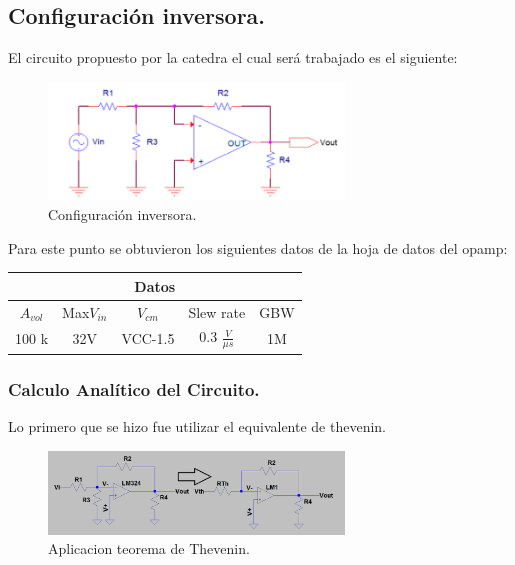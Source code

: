 \subsection{Configuración inversora.}
El circuito propuesto por la catedra el cual será trabajado es el siguiente:

\begin{figure}[htb]	
	\centering
	\includegraphics[width=0.7\textwidth]{Ejercicio1/Imagenes/Circuitoinversor.PNG}
	\caption{Configuración inversora.}
	\label{fig:ConfInv}
\end{figure}
Para este punto se obtuvieron los siguientes datos de la hoja de datos del opamp:
\begin{table}[H]
\begin{center}
\begin{tabular}{|c|c|c|c|c|}
\hline
\multicolumn{5}{|c|}{\textbf{Datos}}                                      \\ \hline
\textbf{$A_{vol}$} & Max$V_{in}$ & $V_{cm}$ & Slew rate             & GBW \\ \hline
100 k              & 32V         & VCC-1.5  & 0.3 $\frac{V}{\mu s}$ & 1M  \\ \hline
\end{tabular}
\end{center}
\end{table}

\subsubsection{Calculo Analítico del Circuito.}
Lo primero que se hizo fue utilizar el equivalente de thevenin.\\

\begin{figure}[htb]	
	\centering
	\includegraphics[width=0.7\textwidth]{Ejercicio1/Imagenes/Thevenin.PNG}
	\caption{Aplicacion teorema de Thevenin.}
	\label{fig:Thevenin}
\end{figure}

